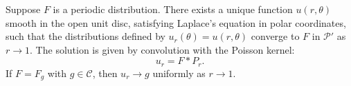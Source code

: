 Suppose $F$ is a periodic distribution. There exists a unique function $u(r, \theta)$ smooth in the open unit disc, satisfying Laplace's equation in polar coordinates, such that the distributions defined by $u_r(\theta) = u(r, \theta)$ converge to $F$ in $\mathcal{P}'$ as $r \to 1$. The solution is given by convolution with the Poisson kernel:
\[
u_r = F * P_r.
\]
If $F = F_g$ with $g \in \mathcal{C}$, then $u_r \to g$ uniformly as $r \to 1$.
